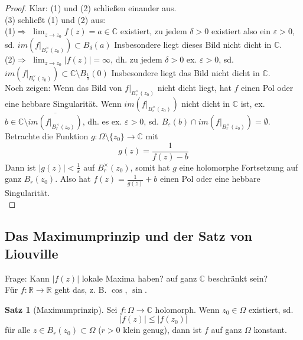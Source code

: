 \documentclass[11pt,titlepage]{article}
\theoremstyle{definition}
\newtheorem{theorem}{Satz}[section]
\theoremstyle{remark}
\begin{document}
	\begin{proof}
		Klar: (1) und (2) schließen einander aus. \\
		(3) schließt (1) und (2) aus: \\
		(1)$\Rightarrow$ $\lim_{z\to z_0} f(z)=a\in\mathbb{C}$ existiert, zu jedem $\delta >0$ existiert 
		also ein $\varepsilon >0$, sd. $im(f|_{B_{\varepsilon}^{\times}(z_0)})\subset B_{\delta}(a)$ 
		Insbesondere liegt dieses Bild nicht dicht in $\mathbb{C}$. \\
		(2)$\Rightarrow$ $\lim_{z\to z_0} |f(z)| =\infty$, dh. zu jedem $\delta >0$ ex. $\varepsilon >0$, 
		sd. $im(f|_{B_{\varepsilon}^{\times}(z_0)})\subset\mathbb{C}\setminus B_{\frac{1}{\delta}}(0)$ 
		Insbesondere liegt das Bild nicht dicht in $\mathbb{C}$. \\
		Noch zeigen: Wenn das Bild von $f|_{B_r^{\times} (z_0)}$ nicht dicht liegt, hat $f$ einen Pol 
		oder eine hebbare Singularität. Wenn $im(f|_{B_r^{\times}(z_0)})$ nicht dicht in 
		$\mathbb{C}$ ist, ex. $b\in\mathbb{C}\setminus\overline{im(f|_{B_r^{\times}(z_0)})}$, dh. es ex. 
		$\varepsilon >0$, sd. $B_{\varepsilon}(b)\cap im(f|_{B_r^{\times}(z_0)})=\emptyset.$ 
		Betrachte die Funktion $g:\Omega\setminus\{z_0\}\to\mathbb{C}$ mit 
		\[ g(z) =\frac{1}{f(z)-b} \]
		Dann ist $|g(z)| < \frac{1}{\varepsilon}$ auf $B_r^{\times}(z_0)$, somit hat $g$ eine holomorphe 
		Fortsetzung auf ganz $B_r (z_0)$. Also hat $f(z)=\frac{1}{g(z)}+b$ einen Pol oder eine 
		hebbare Singularität. \\
	\end{proof}
	
	\subsection{Das Maximumprinzip und der Satz von Liouville}
	
	Frage: Kann $|f(z)|$ lokale Maxima haben? auf ganz $\mathbb{C}$ beschränkt sein? \\
	Für $f:\mathbb{R}\to\mathbb{R}$ geht das, z. B. $\cos$, $\sin$. 
	
	\begin{theorem}[Maximumprinzip] \label{thm:Maxprin}
		Sei $f:\Omega\to\mathbb{C}$ holomorph. Wenn $z_0\in\Omega$ existiert, sd.
		\[ |f(z)|\leq |f(z_0)| \]
		für alle $z\in B_r (z_0)\subset\Omega$ ($r>0$ klein genug), dann ist $f$ auf ganz $\Omega$ 
		konstant.
	\end{theorem}
	
\end{document}
